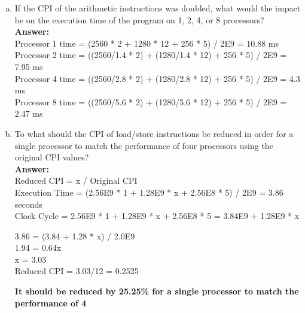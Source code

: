 \documentclass[12pt]{article}
\begin{document}
\begin{enumerate}[(a)]
    \item If the CPI of the arithmetic instructions was doubled, what would the impact be on the execution time of the program on 1, 2, 4, or 8 processors?
    \\
    \textbf{Answer:}
    \\
    Processor 1 time = (2560 * 2 + 1280 * 12 + 256 * 5) / 2E9 = 10.88 ms\\
    Processor 2 time = ((2560/1.4 * 2) + (1280/1.4 * 12) + 256 * 5) / 2E9 = 7.95 ms\\
    Processor 4 time = ((2560/2.8 * 2) + (1280/2.8 * 12) + 256 * 5) / 2E9 = 4.3 ms\\
    Processor 8 time = ((2560/5.6 * 2) + (1280/5.6 * 12) + 256 * 5) / 2E9 = 2.47 ms\\
    \item To what should the CPI of load/store instructions be reduced in order for a single processor to match the performance of four processors using the original CPI values?
    \\
    \textbf{Answer:}
    \\
    Reduced CPI = x / Original CPI\\
    Execution Time = (2.56E9 * 1 + 1.28E9 * x + 2.56E8 * 5) / 2E9 = 3.86 seconds\\
    Clock Cycle = 2.56E9 * 1 + 1.28E9 * x + 2.56E8 * 5 = 3.84E9 + 1.28E9 * x
    \begin{center}    
        3.86 = (3.84 + 1.28 * x) / 2.0E9\\
        1.94 = 0.64x\\
        x = 3.03\\
        Reduced CPI = 3.03/12 = 0.2525\\
    \end{center}
    \textbf{It should be reduced by 25.25\% for a single processor to match the performance of 4}
\end{enumerate}


\end{document}

